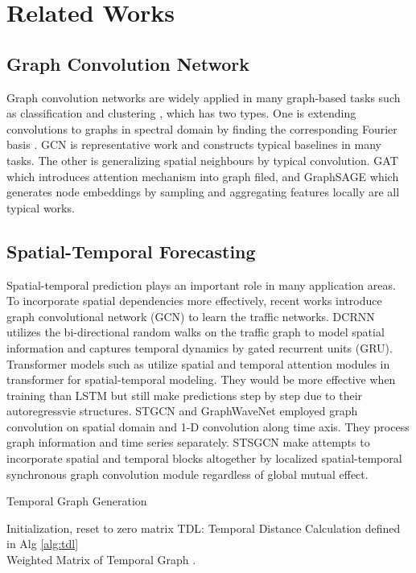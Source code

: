 \documentclass[letterpaper]{article} \usepackage{aaai21}  \usepackage{times}  \usepackage{helvet} \usepackage{courier}  \usepackage[hyphens]{url}  \usepackage{graphicx} \urlstyle{rm} \def\UrlFont{\rm}  \usepackage{natbib}  \usepackage{caption} \frenchspacing  \setlength{\pdfpagewidth}{8.5in}  \setlength{\pdfpageheight}{11in}  \usepackage{multirow}
\begin{document}
\section{Related Works}
\subsection{Graph Convolution Network}
Graph convolution networks are widely applied in many graph-based tasks such as classification \cite{kipf2016semi} and clustering \cite{chiang2019cluster}, which has two types. One is extending convolutions to graphs in spectral domain by finding the corresponding Fourier basis \cite{bruna2013spectral}. GCN \cite{kipf2016semi} is representative work and constructs typical baselines in many tasks. The other is generalizing spatial neighbours by typical convolution. GAT \cite{velivckovic2017graph} which introduces attention mechanism into graph filed, and GraphSAGE \cite{hamilton2017inductive} which generates node embeddings by sampling and aggregating features locally are all typical works.

\subsection{Spatial-Temporal Forecasting}
Spatial-temporal prediction plays an important role in many application areas. To incorporate spatial dependencies more effectively, recent works introduce graph convolutional network (GCN) to learn the traffic networks. DCRNN \cite{li2017diffusion} utilizes the bi-directional random walks on the traffic graph to model spatial information and captures temporal dynamics by gated recurrent units (GRU). Transformer models such as \cite{wang2020traffic,park2019stgrat} utilize spatial and temporal attention modules in transformer for spatial-temporal modeling. They would be more effective when training than LSTM but still make predictions step by step due to their autoregressvie structures. STGCN \cite{yu2017spatio} and GraphWaveNet \cite{wu2019graph} employed graph convolution on spatial domain and 1-D convolution along time axis. They process graph information and time series separately. STSGCN \cite{song2020spatial} make attempts to incorporate spatial and temporal blocks altogether by localized spatial-temporal synchronous graph convolution module regardless of global mutual effect. 

\begin{algorithm}
	\small{
	\caption{\label{alg:tgg} Temporal Graph Generation}
	 Initialization, reset to zero matrix
	TDL: Temporal Distance Calculation defined in Alg \ref{alg:tdl}\\
	\Return Weighted Matrix  of Temporal Graph .
	}
\end{algorithm}
\end{document}
